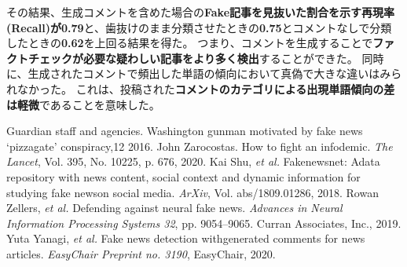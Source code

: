 {	その結果、生成コメントを含めた場合の\textbf{Fake記事を見抜いた割合を示す再現率(Recall)が0.79}と、歯抜けのまま分類させたときの\textbf{0.75}とコメントなしで分類したときの\textbf{0.62}を上回る結果を得た。
	つまり、コメントを生成することで\textbf{ファクトチェックが必要な疑わしい記事をより多く検出}することができた\cite{EasyChair:3190}。
	同時に、生成されたコメントで頻出した単語の傾向において真偽で大きな違いはみられなかった。
	これは、投稿された\textbf{コメントのカテゴリによる出現単語傾向の差は軽微}であることを意味した。

	{\small 
	\begin{thebibliography}{99}
		 Guardian staff and agencies. Washington gunman motivated by fake news `pizzagate' conspiracy,12 2016.
		 John Zarocostas. How to fight an infodemic. \textit{The Lancet}, Vol. 395, No. 10225, p. 676, 2020.
		 Kai Shu, \textit{et al.} Fakenewsnet: Adata repository with news content, social context and dynamic information for studying fake newson social media. \textit{ArXiv}, Vol. abs/1809.01286, 2018.
		 Rowan Zellers, \textit{et al.} Defending against neural fake news. \textit{Advances in Neural Information Processing Systems 32}, pp. 9054–9065. Curran Associates, Inc., 2019.
		 Yuta Yanagi, \textit{et al.} Fake news detection withgenerated comments for news articles. \textit{EasyChair Preprint no. 3190}, EasyChair, 2020.
	\end{thebibliography}
	}
}

